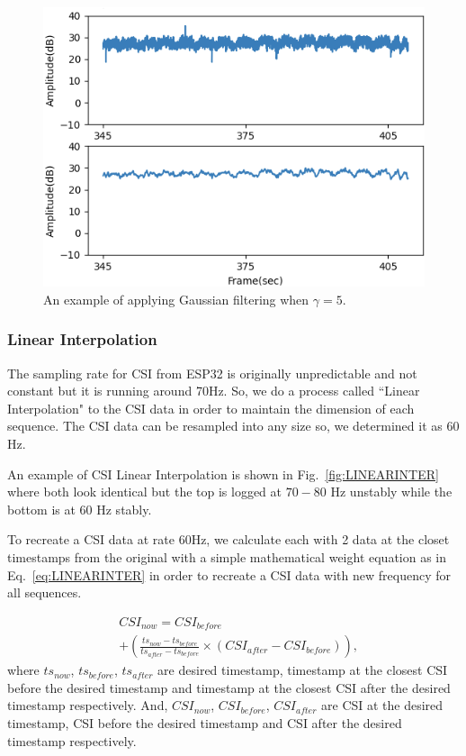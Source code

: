 \documentclass[10pt,letterpaper]{article}
\begin{document}
	
	\begin{figure}[htbp]
		\centerline{\includegraphics[width=120mm,scale=0.9]{FILPD_H2G.png}}
		\caption{An example of applying Gaussian filtering when $\gamma=5$.}
		\label{fig:GAUSSIAN}
	\end{figure}


	\subsubsection*{Linear Interpolation}
	
	The sampling rate for CSI from ESP32 is originally unpredictable and not constant but it is running around 70Hz. So, we do a process called ``Linear Interpolation" to the CSI data in order to maintain the dimension of each sequence. The CSI data can be resampled into any size so, we determined it as 60 Hz.
	
	An example of CSI Linear Interpolation is shown in Fig.~\ref{fig:LINEARINTER} where both look identical but the top is logged at $70-80$ Hz unstably while the bottom is at $60$ Hz stably.
	
To recreate a CSI data at rate 60Hz, we calculate each with 2 data at the closet timestamps from the original with a simple mathematical weight equation as in Eq.~\ref{eq:LINEARINTER} in order to recreate a CSI data with new frequency for all sequences.
	
	\begin{equation}
		\begin{aligned}
			& CSI_{now} = CSI_{before} \\ 
			& + \left(  \frac{ts_{now}-ts_{before}}{ts_{after}-ts_{before}}  \times (CSI_{after}-CSI_{before})   \right),
			\label{eq:LINEARINTER}
		\end{aligned}
	\end{equation}
	where $ts_{now}$, $ts_{before}$, $ts_{after}$ are desired timestamp, timestamp at the closest CSI before the desired timestamp and timestamp at the closest CSI after the desired timestamp respectively. And, $CSI_{now}$, $CSI_{before}$, $CSI_{after}$ are CSI at the desired timestamp, CSI before the desired timestamp and CSI after the desired timestamp respectively.
	
\end{document}
